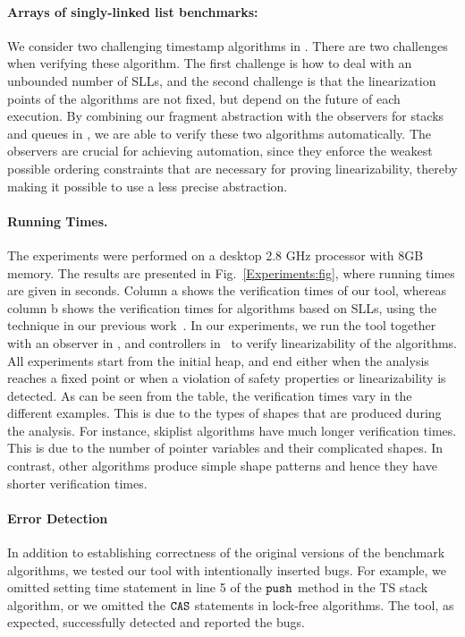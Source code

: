 \paragraph{Arrays of singly-linked list benchmarks:} We consider two challenging timestamp algorithms in \cite{ts-stack}. There are two challenges when verifying these algorithm. The first challenge is how to deal with an unbounded number of SLLs, and the second challenge is that the linearization points of the algorithms are not fixed, but depend on the future of each execution. By combining our fragment abstraction with the observers for stacks and queues in \cite{BEEH:icalp15}, we are able to verify these two algorithms automatically. The observers are crucial for achieving automation, since they
enforce the weakest possible ordering constraints that are necessary for
proving linearizability, thereby making it possible to use a less
precise abstraction.

\paragraph{Running Times.}The experiments were performed on a desktop 2.8 GHz processor with 8GB memory. The results are presented in Fig.~\ref{Experiments:fig}, where running times are given in seconds. Column \textsf{a} shows the verification times of our tool, whereas column \textsf{b} shows the verification times for
algorithms based on SLLs, using the technique in our previous work~\cite{Quy:sas16}.  In our experiments, we run the tool together with an observer in \cite{AHHR:integrated:short}, \cite{BEEH:icalp15} and controllers in~\cite{Quy:sas16} to verify linearizability of the algorithms. All experiments start from the initial heap,  
and end either when the analysis reaches a fixed point or when a violation of safety properties or linearizability is detected. As can be seen from the table, the verification times vary in the different examples. This is due to the types of shapes that are produced during the analysis. For instance, skiplist algorithms have much longer verification times. This is due to the number of pointer variables and their complicated shapes. In contrast, other algorithms 
produce simple shape patterns and hence they have shorter verification times.

\paragraph{Error Detection}
 In addition to establishing correctness of the original versions of the
benchmark algorithms, we tested our tool with intentionally inserted bugs. For example, we omitted setting time statement in line 5 of the ${\tt push}$ method in the TS stack algorithm, or we omitted the $\tt CAS$ statements in lock-free algorithms. The tool, as expected, successfully detected and reported the bugs. 
 

